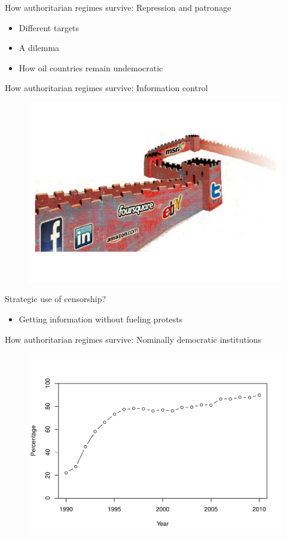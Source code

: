 \documentclass[10pt]{beamer}
\begin{document}
\begin{frame}{How authoritarian regimes survive: Repression and patronage}
	\begin{itemize}
	\item Different targets
	\item A dilemma
	\item How oil countries remain undemocratic
	\end{itemize}
\end{frame}

\begin{frame}{How authoritarian regimes survive: Information control}
	\begin{figure}
	\centering
	\includegraphics[scale=0.35]{Figs/firewall}
	\end{figure}
	\pause
	Strategic use of censorship?
	\begin{itemize}
	\item Getting information without fueling protests
	\end{itemize}
\end{frame}

\begin{frame}{How authoritarian regimes survive: Nominally democratic institutions}
	\begin{figure}
	\centering
	\includegraphics[scale=0.56]{Figs/election}
	\end{figure}
\end{frame}
\end{document}
